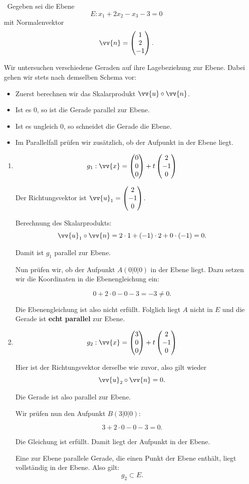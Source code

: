 \documentclass[ngerman, 12pt]{nssheetxea}
\begin{document}
\begin{example} \ 
Gegeben sei die Ebene 
\[
E: x_1 + 2x_2 - x_3 -3 = 0
\]
mit Normalenvektor 
\[
\vv{n}=\colvec[1]{2}{-1}.
\]

Wir untersuchen verschiedene Geraden auf ihre Lagebeziehung zur Ebene. 
Dabei gehen wir stets nach demselben Schema vor:

\begin{itemize}
\item Zuerst berechnen wir das Skalarprodukt $\vv{u} \circ \vv{n}$.
\item Ist es $0$, so ist die Gerade parallel zur Ebene.
\item Ist es ungleich $0$, so schneidet die Gerade die Ebene.
\item Im Parallelfall prüfen wir zusätzlich, ob der Aufpunkt in der Ebene liegt.
\end{itemize}

\begin{enumerate}

\item 
\[
g_1:\vv{x}=\colvec[0]{0}{0}+t\colvec[2]{-1}{0}
\]

Der Richtungsvektor ist $\vv{u}_1=\colvec[2]{-1}{0}$.

Berechnung des Skalarprodukts:
\[
\vv{u}_1 \circ \vv{n}
=
2\cdot 1 + (-1)\cdot 2 + 0\cdot (-1)
= 0.
\]

Damit ist $g_1$ parallel zur Ebene.

Nun prüfen wir, ob der Aufpunkt $A(0|0|0)$ in der Ebene liegt.
Dazu setzen wir die Koordinaten in die Ebenengleichung ein:

\[
0 + 2\cdot 0 - 0 - 3 = -3 \neq 0.
\]

Die Ebenengleichung ist also nicht erfüllt.  
Folglich liegt $A$ nicht in $E$ und die Gerade ist \textbf{echt parallel} zur Ebene.

\bigskip

\item 
\[
g_2:\vv{x}=\colvec[3]{0}{0}+t\colvec[2]{-1}{0}
\]

Hier ist der Richtungsvektor derselbe wie zuvor, also gilt wieder
\[
\vv{u}_2 \circ \vv{n}=0.
\]

Die Gerade ist also parallel zur Ebene.

Wir prüfen nun den Aufpunkt $B(3|0|0)$:

\[
3 + 2\cdot 0 - 0 -3 = 0.
\]

Die Gleichung ist erfüllt.  
Damit liegt der Aufpunkt in der Ebene.

Eine zur Ebene parallele Gerade, die einen Punkt der Ebene enthält, liegt vollständig in der Ebene.  
Also gilt:
\[
g_2 \subset E.
\]


\end{enumerate}
\end{example}
\end{document}
